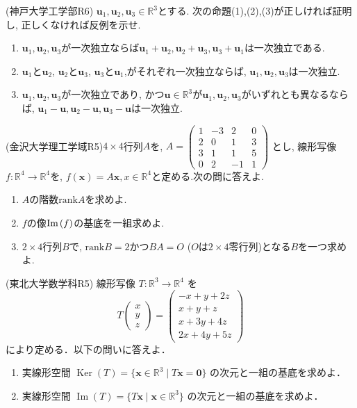 \documentclass[a4j,dvipdfmx]{jsarticle}
\newcommand{\R}{\mathbb{R}}
\newcommand{\rank}{\mathrm{rank}}
\renewcommand{\Im}{\mathrm{Im}\hspace{0.5mm}}
\begin{document}
    \clearpage
    \begin{screen}
        (神戸大学工学部R6) $\bm{u}_1,\bm{u}_2,\bm{u}_3\in\R^3$とする. 次の命題(1),(2),(3)が正しければ証明し, 正しくなければ反例を示せ.
        \begin{enumerate}
            \item $\bm{u}_1,\bm{u}_2,\bm{u}_3$が一次独立ならば$\bm{u}_1+\bm{u}_2,\bm{u}_2+\bm{u}_3,\bm{u}_3+\bm{u}_1$は一次独立である.
            \item $\bm{u}_1$と$\bm{u}_2$, $\bm{u}_2$と$\bm{u}_3$, $\bm{u}_3$と$\bm{u}_1$,がそれぞれ一次独立ならば, $\bm{u}_1,\bm{u}_2,\bm{u}_3$は一次独立.
            \item $\bm{u}_1,\bm{u}_2,\bm{u}_3$が一次独立であり, かつ$\bm{u}\in\mathbb{R}^3$が$\bm{u}_1,\bm{u}_2,\bm{u}_3$がいずれとも異なるならば, $\bm{u}_1-\bm{u},\bm{u}_2-\bm{u},\bm{u}_3-\bm{u}$は一次独立.
        \end{enumerate}
    \end{screen}
    \clearpage
    \begin{screen}
        (金沢大学理工学域R5)$4\times 4$行列$A$を, $A=\begin{pmatrix}
            1 & -3 & 2 & 0\\2 & 0 & 1 & 3\\ 3& 1 & 1 & 5\\0& 2 & -1 & 1
        \end{pmatrix}$
        とし, 線形写像$f:\R^4\to\R^4$を, $f(\bm{x})=A\bm{x},x\in\R^4$と定める.次の問に答えよ.
        \begin{enumerate}
            \item $A$の階数$\rank A$を求めよ.
            \item $f$の像$\Im(f)$の基底を一組求めよ.
            \item $2\times 4$行列$B$で, $\rank B=2$かつ$BA=O$ ($O$は$2\times 4$零行列)となる$B$を一つ求めよ.
        \end{enumerate}
    \end{screen}
    \clearpage
    \begin{screen}
        (東北大学数学科R5) 線形写像 $T: \mathbb{R}^3 \to \mathbb{R}^4$ を
        \[
        T \begin{pmatrix} x \\ y \\ z \end{pmatrix} = \begin{pmatrix} -x + y + 2z \\ x + y + z \\ x + 3y + 4z \\ 2x + 4y + 5z \end{pmatrix}
        \]
        により定める．以下の問いに答えよ．
        \begin{enumerate}
            \item 実線形空間 $\operatorname{Ker}(T) = \{ \bm{x} \in \mathbb{R}^3 \mid T\bm{x} = \bm{0} \}$ の次元と一組の基底を求めよ．
            \item 実線形空間 $\operatorname{Im}(T) = \{ T\bm{x} \mid \bm{x} \in \mathbb{R}^3 \}$ の次元と一組の基底を求めよ．
        \end{enumerate}
    \end{screen}
\end{document}
